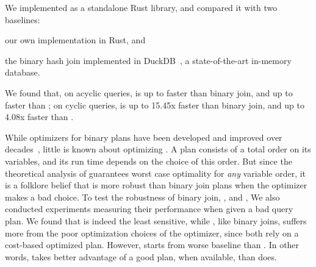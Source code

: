 We implemented \FJ as a standalone Rust library, and
compared it with two baselines:
  \begin{enumerate*}
    \item our own \GJ implementation in Rust, and
    \item the binary hash join implemented in
      DuckDB~\cite{DBLP:conf/cidr/RaasveldtM20,DBLP:conf/vldb/Raasveldt22},
      a state-of-the-art in-memory database.
    \end{enumerate*}
  We found that, on acyclic queries, \FJ is up to \imdbmaxfjbj
  faster than binary join, and up to \imdbmaxfjgj faster than \GJ; on
  cyclic queries, \FJ is up to 15.45x faster than binary join, and up
  to 4.08x faster than \GJ.

  While optimizers for binary plans have been developed and improved
  over decades~\cite{DBLP:conf/sigmod/SelingerACLP79}, little
  is known about optimizing \GJ.  A \GJ plan consists of a total order
  on its variables, and its run time depends on the choice of this
  order.  But since the theoretical analysis of \GJ guarantees worst
  case optimality for {\em any} variable order, it is a folklore
  belief that \GJ is more robust than binary join plans 
  when the optimizer makes a bad choice.
  To test the robustness of binary join, \GJ, and \FJ, 
  We also conducted experiments measuring their 
  performance when given a bad query plan.
  We found that \GJ is indeed the
  least sensitive, while \FJ, like binary joins, suffers more from the
  poor optimization choices of the optimizer, since both rely on a
  cost-based optimized plan.  However, \GJ starts from worse baseline
  than \FJ.  In other words, \FJ takes better advantage of a good
  plan, when available, than \GJ does.


